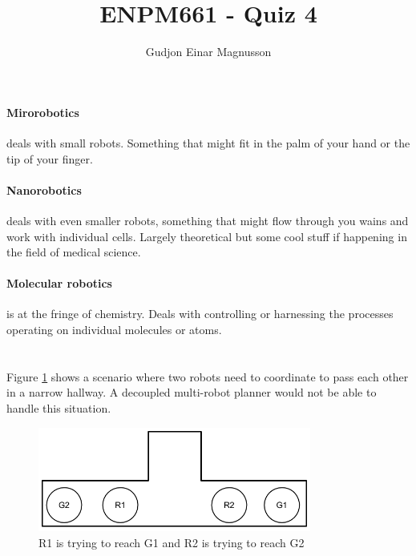 \documentclass[12pt]{article}
\begin{document}
\title{ENPM661 - Quiz 4}
\author{Gudjon Einar Magnusson}

\maketitle

\section{} %

\paragraph{Mirorobotics} deals with small robots. Something that might fit in the palm of your hand or the tip of your finger.

\paragraph{Nanorobotics} deals with even smaller robots, something that might flow through you wains and work with individual cells. Largely theoretical but some cool stuff if happening in the field of medical science.

\paragraph{Molecular robotics} is at the fringe of chemistry. Deals with controlling or harnessing the processes operating on individual molecules or atoms.


\section{} %

Figure \ref{fig:r1_plan} shows a scenario where two robots need to coordinate to pass each other in a narrow hallway. A decoupled multi-robot planner would not be able to handle this situation.

\begin{figure}
\centering
\includegraphics[width=0.8\textwidth]{img/2robot_planning}
\caption{R1 is trying to reach G1 and R2 is trying to reach G2}
\label{fig:r1_plan}
\end{figure}
\end{document}
